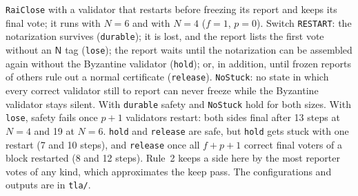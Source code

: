 \documentclass[conference]{IEEEtran}
\newcommand{\tagN}{\mathsf{N}}
\begin{document}
\texttt{RaiClose} with a validator that restarts before freezing its report and keeps its final vote; it runs with $N=6$ and with $N=4$ ($f=1$, $p=0$). Switch \texttt{RESTART}: the notarization survives (\texttt{durable}); it is lost, and the report lists the first vote without an $\tagN$ tag (\texttt{lose}); the report waits until the notarization can be assembled again without the Byzantine validator (\texttt{hold}); or, in addition, until frozen reports of others rule out a normal certificate (\texttt{release}). \texttt{NoStuck}: no state in which every correct validator still to report can never freeze while the Byzantine validator stays silent. With \texttt{durable} safety and \texttt{NoStuck} hold for both sizes. With \texttt{lose}, safety fails once $p+1$ validators restart: both sides final after 13 steps at $N=4$ and 19 at $N=6$. \texttt{hold} and \texttt{release} are safe, but \texttt{hold} gets stuck with one restart (7 and 10 steps), and \texttt{release} once all $f+p+1$ correct final voters of a block restarted (8 and 12 steps). Rule~2 keeps a side here by the most reporter votes of any kind, which approximates the keep pass. The configurations and outputs are in \texttt{tla/}.
\end{document}
